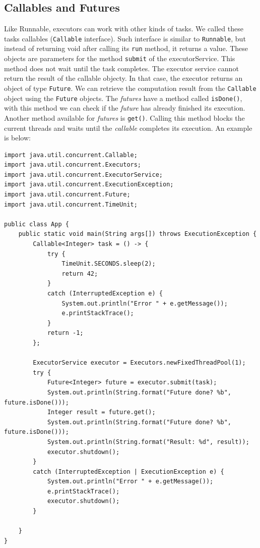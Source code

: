\documentclass[openany, a4paper]{book}
\theoremstyle{break}
\theoremstyle{example}
\theoremstyle{note}
\theoremstyle{break}
\theoremstyle{exercise}
\begin{document}
\subsection{Callables and Futures}
\label{sec:org585a208}

Like Runnable, executors can work with other kinds of tasks. We called these
tasks callables (\texttt{Callable} interface). Such interface is similar to \texttt{Runnable},
but instead of returning void after calling its \texttt{run} method, it returns a
value. These objects are parameters for the method \texttt{submit} of the
executorService. This method does not wait until the task completes. The
executor service cannot return the result of the callable objecty. In that
case, the executor returns an object of type \texttt{Future}. We can retrieve the
computation result from the \texttt{Callable} object using the \texttt{Future} objects. The
\emph{futures} have a method called \texttt{isDone()}, with this method we can check if the
\emph{future} has already finished its execution. Another method available for
\emph{futures} is \texttt{get()}. Calling this method blocks the current threads and waits
until the \emph{callable} completes its execution. An example is below:


\begin{verbatim}
import java.util.concurrent.Callable;
import java.util.concurrent.Executors;
import java.util.concurrent.ExecutorService;
import java.util.concurrent.ExecutionException;
import java.util.concurrent.Future;
import java.util.concurrent.TimeUnit;

public class App {
    public static void main(String args[]) throws ExecutionException {
        Callable<Integer> task = () -> {
            try {
                TimeUnit.SECONDS.sleep(2);
                return 42;
            }
            catch (InterruptedException e) {
                System.out.println("Error " + e.getMessage());
                e.printStackTrace();
            }
            return -1;
        };

        ExecutorService executor = Executors.newFixedThreadPool(1);
        try {
            Future<Integer> future = executor.submit(task);
            System.out.println(String.format("Future done? %b", future.isDone()));
            Integer result = future.get();
            System.out.println(String.format("Future done? %b", future.isDone()));
            System.out.println(String.format("Result: %d", result));
            executor.shutdown();
        }
        catch (InterruptedException | ExecutionException e) {
            System.out.println("Error " + e.getMessage());
            e.printStackTrace();
            executor.shutdown();
        }

    }
}
\end{verbatim}
\end{document}
